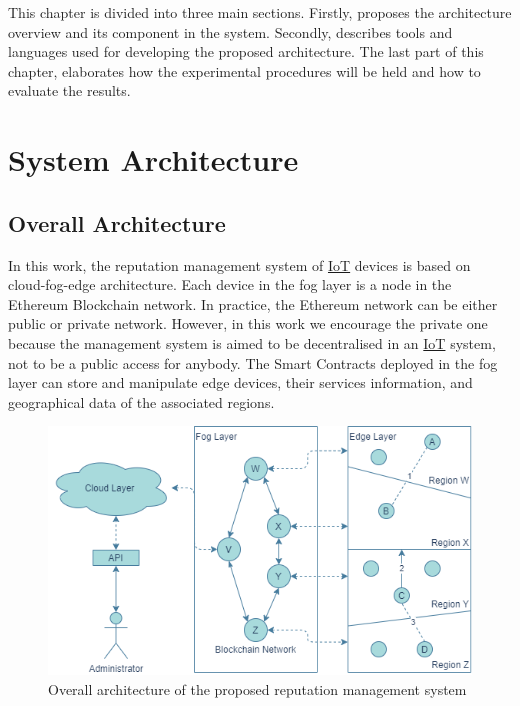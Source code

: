 \npara This chapter is divided into three main sections. Firstly,  proposes the architecture overview and its component in the system.
Secondly, \textbf{} describes tools and languages used for developing the proposed architecture.
The last part of this chapter,  elaborates how the experimental procedures will be held and how to evaluate the results.

\section{System Architecture} \label{Methodology-Architecture}

\subsection{Overall Architecture} \label{Methodology-Architecture-Overall}

\npara In this work, the reputation management system of \hyperref[Acronym-IoT]{IoT} devices is based on cloud-fog-edge architecture.
Each device in the fog layer is a node in the Ethereum Blockchain network.
In practice, the Ethereum network can be either public or private network.
However, in this work we encourage the private one because the management system is aimed to be decentralised in an \hyperref[Acronym-IoT]{IoT} system, not to be a public access for anybody.
The Smart Contracts deployed in the fog layer can store and manipulate edge devices, their services information, and geographical data of the associated regions.

\begin{figure}[hbt!]
  \centering
  \includegraphics[width=\textwidth]{images/OverallArchitecture.png}
  \caption{Overall architecture of the proposed reputation management system}
  \label{fig:OverallArchitecture}
\end{figure}

